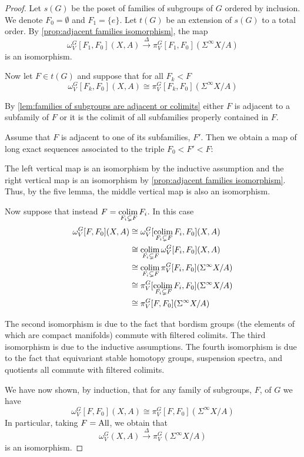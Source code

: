 \documentclass[11pt]{amsart}
\newcommand{\All}{\textup{All}}
\newcommand{\colim}{\textup{colim}\,}
\theoremstyle{plain}   %
\theoremstyle{definition}
\theoremstyle{remark}
\numberwithin{equation}{section}
\begin{document}
\begin{proof}
Let $s(G)$ be the poset of families of subgroups of $G$ ordered by inclusion. We denote $F_0=\emptyset$ and $F_1=\{e\}$. Let $t(G)$ be an extension of $s(G)$ to a total order. By \cref{prop:adjacent families isomorphism}, the map
\[
\omega_V^G[F_1,F_0](X,A)\xrightarrow{\Delta} \pi_V^G[F_1,F_0](\Sigma^\infty X/A)
\]
is an isomorphism. 

Now let $F\in t(G)$ and suppose that for all $F_k<F$ 
\[
\omega_V^G[F_k,F_0](X,A)\cong \pi_V^G[F_k,F_0](\Sigma^\infty X/A)
\]

By \cref{lem:families of subgroups are adjacent or colimits} either $F$ is adjacent to a subfamily of $F$ or it is the colimit of all subfamilies properly contained in $F$. 

Assume that $F$ is adjacent to one of its subfamilies, $F'$. Then we obtain a map of long exact sequences associated to the triple $F_0<F'<F$:
\begin{figure}[H]
\center
{}
\end{figure}
The left vertical map is an isomorphism by the inductive assumption and the right vertical map is an isomorphism by \cref{prop:adjacent families isomorphism}. Thus, by the five lemma, the middle vertical map is also an isomorphism.


Now suppose that instead $F= \underset{F_i\subsetneq F}{\colim}F_i$. In this case
\begin{align*}
\omega_V^G[F,F_0](X,A)
& \cong \omega_V^G[\underset{F_i\subsetneq F}{\colim}F_i,F_0](X,A)\\
& \cong \underset{F_i\subsetneq F}{\colim}\omega_V^G[F_i,F_0](X,A)\\
& \cong \underset{F_i\subsetneq F}{\colim} \pi_V^G[F_i,F_0](\Sigma^\infty X/A)\\
& \cong \pi_V^G[\underset{F_i\subsetneq F}{\colim}F_i,F_0](\Sigma^\infty X/A)\\
& \cong \pi_V^G[F,F_0](\Sigma^\infty X/A)
\end{align*}

The second isomorphism is due to the fact that bordism groups (the elements of which are compact manifolds) commute with filtered colimits. The third isomorphism is due to the inductive assumptions. The fourth isomorphism is due to the fact that equivariant stable homotopy groups, suspension spectra, and quotients all commute with filtered colimits. 

We have now shown, by induction, that for any family of subgroups, $F$, of $G$ we have
\[
\omega_V^G[F,F_0](X,A)\cong \pi_V^G[F,F_0](\Sigma^\infty X/A)
\]
In particular, taking $F= \All$, we obtain that
\[
\omega_V^G(X,A) \xrightarrow{\Delta} \pi_V^G(\Sigma^\infty X/A)
\]
is an isomorphism. 
\end{proof}
\end{document}

